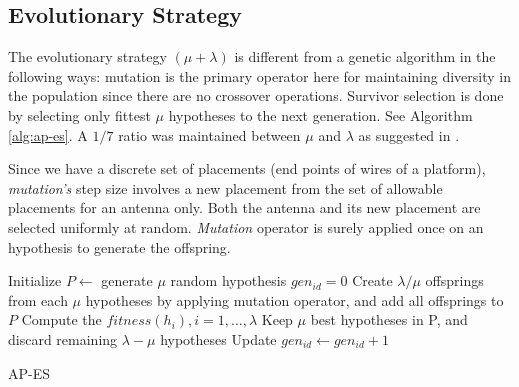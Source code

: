 \documentclass{sig-alternate}
\begin{document}
\subsection{Evolutionary Strategy}
\label{seThe placement space is finite as we shall elaborate further in Section c:algorithms-es}
The evolutionary strategy $(\mu + \lambda)$ \cite{schwefel1977numerische, fogel1994introduction} is different from a genetic algorithm in the following ways: 
mutation is the primary operator here for maintaining diversity in the population since there are no crossover operations. Survivor selection is done by selecting only fittest $\mu$ hypotheses to the next generation. See Algorithm \ref{alg:ap-es}. A $1/7$ ratio was maintained between $\mu$ and $\lambda$ as suggested in \cite{eiben2010introduction}. 

Since we have a discrete set of placements (end points of wires of a platform), \textit{mutation's} step size involves a new placement from the set of allowable placements for an antenna only. Both the antenna and its new placement are selected uniformly at random. \textit{Mutation} operator is surely applied once on an hypothesis to generate the offspring.
\begin{algorithm}[!ht]
{}
Initialize $P\leftarrow$ generate $\mu$ random hypothesis \;
$gen_{id}=0$ \;
 {
Create $\lambda / \mu$ offsprings from  each $\mu$ hypotheses by applying mutation operator, and add all offsprings to $P$ \;
Compute the $fitness(h_i), i=1,\ldots, \lambda$ \;
Keep $\mu$ best hypotheses in P, and discard remaining $\lambda - \mu$ hypotheses \;
Update $gen_{id} \leftarrow gen_{id}+1$
}
\caption{AP-ES}
\label{alg:ap-es}
\end{algorithm}
\end{document}
